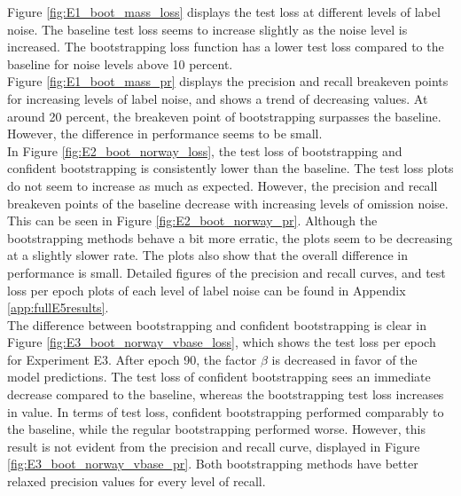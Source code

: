 Figure \ref{fig:E1_boot_mass_loss} displays the test loss at different levels of label noise. The baseline test loss seems to increase slightly as the noise level is increased. The bootstrapping loss function has a lower test loss compared to the baseline for  noise levels above 10 percent.\\

Figure \ref{fig:E1_boot_mass_pr} displays the precision and recall breakeven points for  increasing levels of label noise, and shows a trend of decreasing values.  At around 20 percent, the breakeven point of bootstrapping surpasses the baseline. However, the difference in performance seems to be small.\\

In Figure \ref{fig:E2_boot_norway_loss}, the test loss of bootstrapping and confident bootstrapping is consistently lower than the baseline. The test loss plots do not seem to increase as much as expected. However, the precision and recall breakeven points of the baseline decrease with increasing levels of omission noise. This can be seen in Figure \ref{fig:E2_boot_norway_pr}. Although the bootstrapping methods behave a bit more erratic, the plots seem to be decreasing at a slightly slower rate. The plots also show that the overall difference in performance is small. Detailed figures of the precision and recall curves, and test loss per epoch plots of each level of label noise can be found in Appendix \ref{app:fullE5results}. \\

The difference between bootstrapping and confident bootstrapping is clear in Figure \ref{fig:E3_boot_norway_vbase_loss}, which shows the test loss per epoch for Experiment E3. After epoch 90, the factor $\beta$ is decreased in favor of the model predictions. The test loss of confident bootstrapping sees an immediate decrease compared to the baseline, whereas the bootstrapping test loss increases in value. In terms of test loss, confident bootstrapping performed comparably to the baseline, while the regular bootstrapping performed worse. However, this result is not evident from the precision and recall curve, displayed in Figure \ref{fig:E3_boot_norway_vbase_pr}. Both bootstrapping methods have better relaxed precision values  for every level of recall. \\

